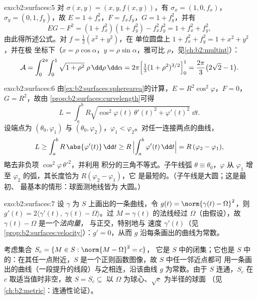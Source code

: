 \begin{solution}{exo:b2:surfaces:5}
对 $\sigma(x, y) = (x, y, f(x,y))$，有 $\sigma_x = (1, 0, f_x)$，
$\sigma_y = (0, 1, f_y)$，故 $E = 1 + f_x^2$，$F = f_xf_y$，$G = 1
+ f_y^2$，并有
\[
EG - F^2 = (1 + f_x^2)(1 + f_y^2) - f_x^2f_y^2
= 1 + f_x^2 + f_y^2 ,
\]
由此得所述公式。对 $f = \frac12(x^2 + y^2)$，在
单位圆盘上 $1 + f_x^2 + f_y^2 = 1 + x^2 + y^2$，并在极
坐标下（$x = \rho\cos\alpha$，$y = \rho\sin\alpha$，雅可比
$\rho$，见\cref{ch:b2:multint}）：
\[
\mathcal{A}
= \int_0^{2\pi}\!\!\int_0^1 \sqrt{1 + \rho^2}\;\rho
\,\dd\rho\,\dd\alpha
= 2\pi\Bigl[\tfrac13(1 + \rho^2)^{3/2}\Bigr]_0^1
= \frac{2\pi}{3}\bigl(2\sqrt2 - 1\bigr).
\]
\end{solution}

\begin{solution}{exo:b2:surfaces:6}
由\cref{ex:b2:surfaces:spherearea}的计算，$E =
R^2\cos^2\varphi$，$F = 0$，$G = R^2$，故由
\cref{prop:b2:surfaces:curvelength}可得
\[
L = \int_a^b R\sqrt{\cos^2\varphi(t)\,\theta'(t)^2
+ \varphi'(t)^2}\;\dd t .
\]
设端点为 $(\theta_0, \varphi_1)$ 与 $(\theta_0,
\varphi_2)$，$\varphi_1 < \varphi_2$。对任一连接两点的曲线，
\[
L \geq \int_a^b R\,\abs{\varphi'(t)}\,\dd t
\geq R\,\Bigl|\int_a^b \varphi'(t)\,\dd t\Bigr|
= R\,(\varphi_2 - \varphi_1),
\]
略去非负项 $\cos^2\varphi\,\theta'^2$，并利用
积分的三角不等式。子午线弧
$\theta \equiv \theta_0$，$\varphi$ 从 $\varphi_1$ 增至
$\varphi_2$ 的弧，其长度恰为 $R(\varphi_2 - \varphi_1)$，它
是最短的。（子午线是大圆；这是最初、
最基本的情形：球面测地线皆为
大圆。）
\end{solution}

\begin{solution}{exo:b2:surfaces:7}
设 $\gamma$ 为 $S$ 上画出的一条曲线，令 $g(t) = \norm{\gamma(t)
- \Omega}^2$，则 $g'(t) = 2\langle \gamma'(t),\ \gamma(t) -
\Omega\rangle$。过 $M = \gamma(t)$ 的法线经过
$\Omega$（由假设），故 $\gamma(t) - \Omega$ 是一个\emph{法向量}，
与正交，特别地与
速度 $\gamma'(t)$（见\cref{prop:b2:surfaces:velocity}）：$g' =
0$，从而 $g$ 沿每条画出的曲线为常数。

考虑集合 $S_c = \{M \in S : \norm{M - \Omega}^2 = c\}$，
它是 $S$ 中的闭集；它也是 $S$ 中的：在其任一点附近，$S$
是一个正则函数图像，故 $S$ 中任一邻近点都可
用一条画出的曲线（一段提升的线段）与之相连，沿该曲线 $g$ 为常数。由于
$S$ 连通，$S_c$ 在 $c$ 取适当值时非空，故 $S = S_c
\subseteq$ 以 $\Omega$ 为球心、$\sqrt c$ 为半径的球面
（见\cref{ch:b2:metric}：连通性论证）。
\end{solution}

